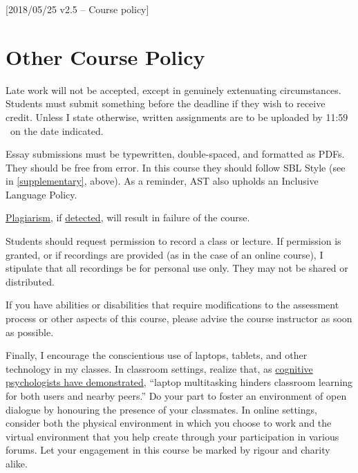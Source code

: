 [2018/05/25 v2.5 -- Course policy]

\section{Other Course Policy}
\label{policy}

Late work will not be accepted, except in genuinely extenuating
circumstances. Students must submit something before the deadline if
they wish to receive credit. Unless I state otherwise, written
assignments are to be uploaded by 11:59 \PM\ on the date indicated.

Essay submissions must be typewritten, double-spaced, and formatted as
PDFs. They should be free from error. In this course they should follow
SBL Style (see \cite{sbl2} in \autoref{supplementary}, above). As a
reminder, AST also upholds an Inclusive Language Policy.

\href{http://www.eerdmans.com/Pages/Item/59043/Commentary-Statement.aspx}{Plagiarism},
if \href{https://www.theguardian.com/world/2013/feb/09/german-education-minister-quits-phd-plagiarism}{detected},
will result in failure of the course.

Students should request permission to record a class or lecture. If
permission is granted, or if recordings are provided (as in the case of
an online course), I stipulate that all recordings be for personal use
only. They may not be shared or distributed.

If you have abilities or disabilities that require modifications to the
assessment process or other aspects of this course, please advise the
course instructor as soon as possible.

Finally, I encourage the conscientious use of laptops, tablets, and
other technology in my classes. In classroom settings, realize that, as
\href{http://dx.doi.org/10.1016/j.compedu.2012.10.003}{cognitive
psychologists have demonstrated}, ``laptop multitasking hinders
classroom learning for both users and nearby peers.'' Do your part to
foster an environment of open dialogue by honouring the presence of your
classmates. In online settings, consider both the physical environment
in which you choose to work and the virtual environment that you help
create through your participation in various forums. Let your engagement
in this course be marked by rigour and charity alike.